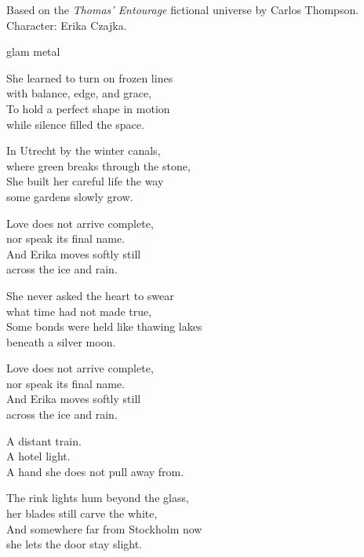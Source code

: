 

\begin{notes}
Based on the \emph{Thomas’ Entourage} fictional universe by Carlos Thompson.\\
Character: Erika Czajka.\\
\end{notes}

\begin{style}
glam metal
\end{style}

\begin{lyrics}

She learned to turn on frozen lines\\
with balance, edge, and grace,\\
To hold a perfect shape in motion\\
while silence filled the space.

In Utrecht by the winter canals,\\
where green breaks through the stone,\\
She built her careful life the way\\
some gardens slowly grow.

Love does not arrive complete,\\
nor speak its final name.\\
And Erika moves softly still\\
across the ice and rain.

She never asked the heart to swear\\
what time had not made true,\\
Some bonds were held like thawing lakes\\
beneath a silver moon.

Love does not arrive complete,\\
nor speak its final name.\\
And Erika moves softly still\\
across the ice and rain.

A distant train.\\
A hotel light.\\
A hand she does not pull away from.

The rink lights hum beyond the glass,\\
her blades still carve the white,\\
And somewhere far from Stockholm now\\
she lets the door stay slight.


\end{lyrics}
